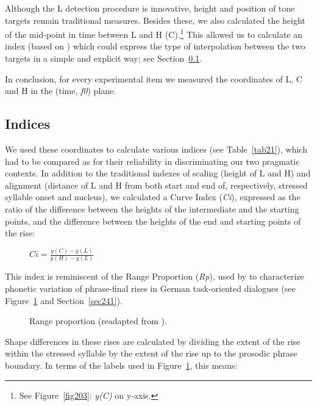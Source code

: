 Although the L detection procedure is innovative, height and position of tone targets remain traditional measures. Besides these, we also calculated the height of the mid-point in time between L and H (C).\footnote{See Figure~\ref{fig203}: \textit{y(C)} on y-axis.} This allowed us to calculate an index (based on \citealt{dombrowski2005acoustic}) which could express the type of interpolation between the two targets in a simple and explicit way; see Section~\ref{sec223}.

In conclusion, for every experimental item we measured the coordinates of L, C and H in the (time, \textit{f0}) plane.

\subsection{Indices}\label{sec223}
We used these coordinates to calculate various indices (see Table~\ref{tab21}), which had to be compared as for their reliability in discriminating our two pragmatic contexts. In addition to the traditional indexes of scaling (height of L and H) and alignment (distance of L and H from both start and end of, respectively, stressed syllable onset and nucleus), we calculated a Curve Index (\textit{Ci}), expressed as the ratio of the difference between the heights of the intermediate and the starting points, and the difference between the heights of the end and starting points of the rise:

\begin{description}
   \item[] \(Ci=\frac{y(C)-y(L)}{y(H)-y(L)}\)
\end{description}

This index is reminiscent of the Range Proportion (\textit{Rp}), used by \citet{dombrowski2005acoustic} to characterize phonetic variation of phrase-final rises in German task-oriented dialogues (see Figure~\ref{fig205} and Section~\ref{sec241}). 

\begin{figure}
\centering
{}
\caption{Range proportion (readapted from \citet[Figure~3]{dombrowski2005acoustic}).}
\label{fig205}\end{figure}

Shape differences in these rises are calculated by dividing the extent of the rise within the stressed syllable by the extent of the rise up to the prosodic phrase boundary. In terms of the labels used in Figure~\ref{fig205}, this means:

